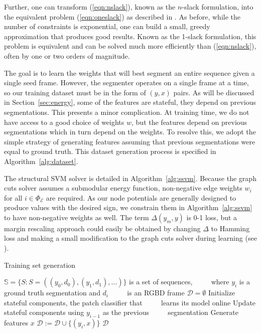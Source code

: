 \documentclass[journal]{IEEEtran}
\begin{document}
Further, one can transform (\ref{eqn:nslack}), known as the $n$-slack formulation, into the equivalent problem (\ref{eqn:oneslack}) as described in \cite{joachims2009a}.  As before, while the number of constraints is exponential, one can build a small, greedy approximation that produces good results.  Known as the 1-slack formulation, this problem is equivalent and can be solved much more efficiently than (\ref{eqn:nslack}), often by one or two orders of magnitude.


The goal is to learn the weights that will best segment an entire sequence given a single seed frame.  However, the segmenter operates on a single frame at a time, so our training dataset must be in the form of $(y, x)$ pairs. As will be discussed in Section~\ref{sec:energy}, some of the features are stateful, \ie they depend on previous segmentations.  This presents a minor complication.  At training time, we do not have access to a good choice of weights $w$, but the features depend on previous segmentations which in turn depend on the weights.  To resolve this, we adopt the simple strategy of generating features assuming that previous segmentations were equal to ground truth.  This dataset generation process is specified in Algorithm~\ref{alg:dataset}.

The structural SVM solver is detailed in Algorithm~\ref{alg:ssvm}.  Because the graph cuts solver assumes a submodular energy function, non-negative edge weights $w_i$ for all $i \in \Phi_{\mathcal{E}}$ are required.  As our node potentials are generally designed to produce values with the desired sign, we constrain them in Algorithm~\ref{alg:ssvm} to have non-negative weights as well.  The term $\Delta (y_m, y)$ is 0-1 loss, but a margin rescaling approach could easily be obtained by changing $\Delta$ to Hamming loss and making a small modification to the graph cuts solver during learning (see \cite{szummer2008a}). 

\begin{algorithm}
  \caption{Training set generation}
  \label{alg:dataset}
  \begin{algorithmic}
    \STATE $\mathbb{S} = \{S : S = ((y_0, d_0), (y_1, d_1),                       \dots)\}$ is a set of sequences,
\STATE $\qquad$ where $y_i$ is a ground truth segmentation and $d_i$ \STATE $\qquad$ is an RGBD frame
\STATE $\mathcal{D} = \emptyset$
\STATE Initialize stateful components, \eg the patch classifier that \STATE $\qquad$ learns its model online
\STATE Update stateful components using $y_{i-1}$ as the previous \STATE $\qquad$ segmentation
\STATE Generate features $x$
\STATE $\mathcal{D} := \mathcal{D} \cup \{(y_i, x)\}$
\ENDFOR
\ENDFOR
\RETURN $\mathcal{D}$
  \end{algorithmic}
\end{algorithm}
\end{document}
